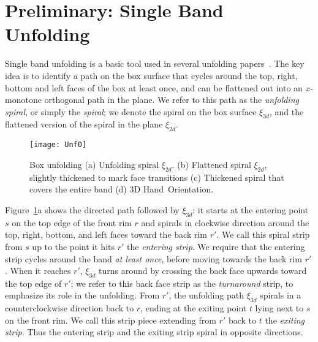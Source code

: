 \documentclass[11pt]{article}
\newcommand\hand{{\sc Hand}}
\begin{document}
\section{Preliminary: Single Band Unfolding}
\label{sec:boxunf}
Single band unfolding is a basic tool used in several unfolding papers~\cite{Damian-Flatland-O'Rourke-2007-epsilon, Damian-Flatland-O'Rourke-2008-manhattan, Damian-Demaine-Flatland-2012-epsilon}. 
The key idea is to identify a path on the box surface that cycles around the top, right, bottom and left faces of the box at least once, and can be flattened out into an $x$-monotone orthogonal path in the plane. We refer to this path as the \emph{unfolding spiral}, or simply the \emph{spiral}; we denote the spiral on the box surface $\xi_{3d}$, and the flattened version of the spiral in the plane $\xi_{2d}$.

\begin{figure}[htbp]
\centering
\texttt{[image: Unf0]}
\caption{Box unfolding (a) Unfolding spiral $\xi_{2d}$.
(b) Flattened spiral $\xi_{2d}$, slightly thickened to mark face transitions (c) Thickened spiral that covers the entire band (d) 3D \hand\ Orientation.}
\label{fig:Unf0}
\end{figure}


Figure~\ref{fig:Unf0}a shows the directed path followed by $\xi_{3d}$: it starts
at the entering point $s$ on the top edge of the front rim $r$ and spirals in clockwise
direction around the top, right, bottom, and left faces toward the back rim $r'$.
We call this spiral strip from $s$ up to the point it hits $r'$ the \emph{entering strip}.
We require that the entering strip cycles around the band \emph{at least once}, before
moving towards the back rim $r'$.
When it reaches $r'$, $\xi_{3d}$ turns around by crossing the back face upwards toward
the top edge of $r'$; we refer to this back face strip as the \emph{turnaround} strip, to emphasize its role in the unfolding. From $r'$, the unfolding path $\xi_{3d}$ spirals in a counterclockwise direction back to $r$, ending at
the exiting point $t$ lying next to $s$ on the front rim. We call this strip piece extending
from $r'$ back to $t$ the \emph{exiting strip}. Thus the entering strip and the exiting
strip spiral in opposite directions.
\end{document}
